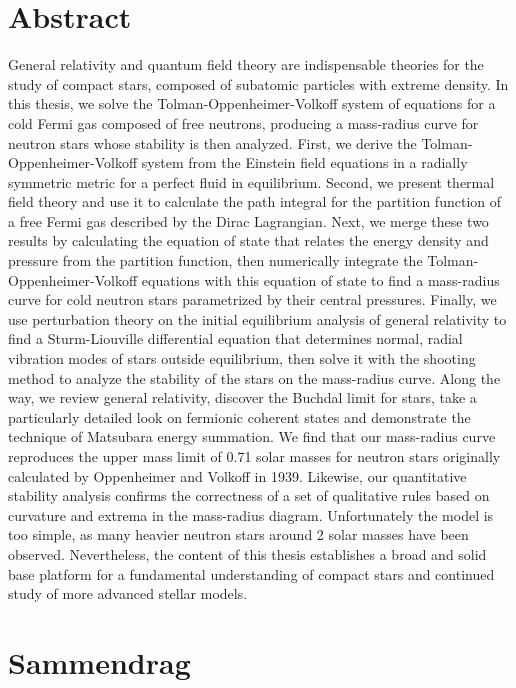 \chapter*{Abstract}

General relativity and quantum field theory are indispensable theories for the study of compact stars, composed of subatomic particles with extreme density.
In this thesis, we solve the Tolman-Oppenheimer-Volkoff system of equations for a cold Fermi gas composed of free neutrons, producing a mass-radius curve for neutron stars whose stability is then analyzed.
First, we derive the Tolman-Oppenheimer-Volkoff system from the Einstein field equations in a radially symmetric metric for a perfect fluid in equilibrium.
Second, we present thermal field theory and use it to calculate the path integral for the partition function of a free Fermi gas described by the Dirac Lagrangian.
Next, we merge these two results by calculating the equation of state that relates the energy density and pressure from the partition function, then numerically integrate the Tolman-Oppenheimer-Volkoff equations with this equation of state to find a mass-radius curve for cold neutron stars parametrized by their central pressures.
Finally, we use perturbation theory on the initial equilibrium analysis of general relativity to find a Sturm-Liouville differential equation that determines normal, radial vibration modes of stars outside equilibrium, then solve it with the shooting method to analyze the stability of the stars on the mass-radius curve.
Along the way, we review general relativity, discover the Buchdal limit for stars, take a particularly detailed look on fermionic coherent states and demonstrate the technique of Matsubara energy summation.
We find that our mass-radius curve reproduces the upper mass limit of 0.71 solar masses for neutron stars originally calculated by Oppenheimer and Volkoff in 1939.
Likewise, our quantitative stability analysis confirms the correctness of a set of qualitative rules based on curvature and extrema in the mass-radius diagram.
Unfortunately the model is too simple, as many heavier neutron stars around 2 solar masses have been observed.
Nevertheless, the content of this thesis establishes a broad and solid base platform for a fundamental understanding of compact stars and continued study of more advanced stellar models.


\chapter*{Sammendrag}
